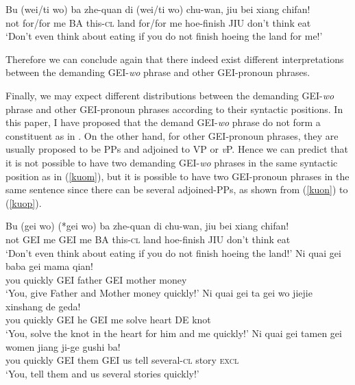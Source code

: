 \documentclass[output=paper,colorlinks,citecolor=brown]{langscibook}
\begin{document}
\ea
\label{kuor}
\gll Bu (wei/ti wo) ba zhe-quan di      (wei/ti wo) chu-wan,   jiu bei 	    xiang   chifan!\\  
     not for/for me BA this-\textsc{cl}  land    for/for me  hoe-finish JIU don't    think   eat\\ 
\glt `Don't even think about eating if you do not finish hoeing the land for me!'
\z

Therefore we can conclude again that there indeed exist different interpretations between the demanding GEI-\textit{wo} phrase and other GEI-pronoun phrases.

Finally, we may expect different distributions between the demanding GEI-\textit{wo} phrase and other GEI-pronoun phrases according to their syntactic positions. In this paper, I have proposed that the demand GEI-\textit{wo} phrase do not form a constituent as in . On the other hand, for other GEI-pronoun phrases, they are usually proposed to be PPs and adjoined to VP or \textit{v}P. Hence we can predict that it is not possible to have two demanding GEI-\textit{wo} phrases in the same syntactic position as in (\ref{kuom}), but it is possible to have two GEI-pronoun phrases in the same sentence since there can be several adjoined-PPs, as shown from (\ref{kuon}) to (\ref{kuop}).

\ea
\label{kuom}
\gll Bu     (gei wo)    (*gei wo)    ba zhe-quan di 	    chu-wan,   jiu bei 	xiang	chifan!\\  
     not     GEI me       GEI me     BA this-\textsc{cl}  land    hoe-finish JIU don't   think    eat   \\ 
\glt `Don't even think about eating if you do not finish hoeing the land!'
\ex
\label{kuon}
\gll Ni     quai    gei baba    gei mama    qian!\\  
     you    quickly GEI father  GEI mother  money\\ 
\glt `You, give Father and Mother money quickly!'
\ex
\label{kuoo}
\gll Ni     quai    gei ta  gei wo  jiejie  xinshang    de  geda!\\  
     you    quickly GEI he  GEI me  solve   heart       DE  knot\\ 
\glt `You, solve the knot in the heart for him and me quickly!'
\ex
\label{kuop}
\gll Ni     quai    gei tamen   gei women   jiang   ji-ge       gushi   ba!\\  
     you    quickly GEI them    GEI us      tell    several-\textsc{cl}  story   \textsc{excl}\\ 
\glt `You, tell them and us several stories quickly!'
\z
\end{document}
